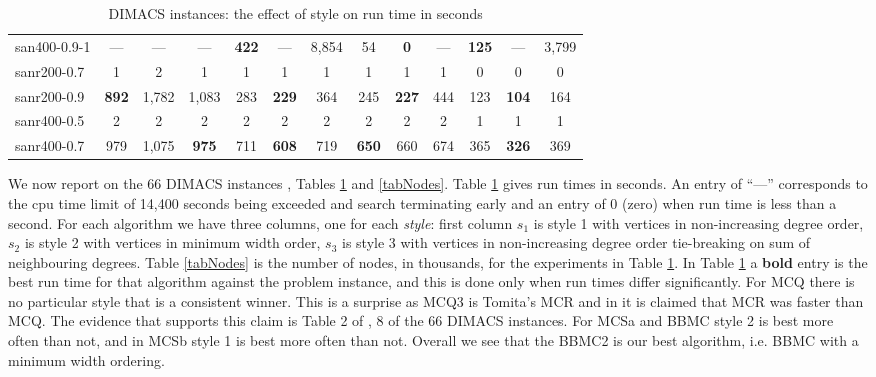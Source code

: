 \documentclass{l4proj}
\begin{document}
\begin{table}
\begin{center}
\begin{tiny}
\begin{tabular}{|l|c c c|c c c|c c c|c c c|}
san400-0.9-1 & --- & --- & --- & \bf{422} & --- & 8,854 & 54 & \bf{0} & --- & \bf{125} & --- & 3,799 \\ 
sanr200-0.7 & 1 & 2 & 1 & 1 & 1 & 1 & 1 & 1 & 1 & 0 & 0 & 0 \\ 
sanr200-0.9 & \bf{892} & 1,782 & 1,083 & 283 & \bf{229} & 364 & 245 & \bf{227} & 444 & 123 & \bf{104} & 164 \\ 
sanr400-0.5 & 2 & 2 & 2 & 2 & 2 & 2 & 2 & 2 & 2 & 1 & 1 & 1 \\ 
sanr400-0.7 & 979 & 1,075 & \bf{975} & 711 & \bf{608} & 719 & \bf{650} & 660 & 674 & 365 & \bf{326} & 369 \\ \hline
\end{tabular}
\end{tiny}
\end{center}
\caption{DIMACS instances: the effect of style on run time in seconds}
\label{tabTime}
\end{table}


We now report on the 66 DIMACS instances \cite{DIMACS}, Tables \ref{tabTime} and \ref{tabNodes}.
Table \ref{tabTime} gives run times in seconds. An entry of ``---'' corresponds to the cpu time limit of 14,400 seconds being exceeded and
search terminating early and an entry of 0 (zero) when run time is less than a second. For each algorithm we have three columns, 
one for each \emph{style}: first column $s_1$ is
style 1 with vertices in non-increasing degree order, $s_2$ is style 2 with vertices in minimum width order, $s_3$ is style 3 with
vertices in non-increasing degree order tie-breaking on sum of neighbouring degrees. Table \ref{tabNodes} is the number of
nodes, in thousands, for the experiments in Table \ref{tabTime}. In Table \ref{tabTime} a {\bf bold} entry is the best 
run time for that algorithm against the problem instance, and this is done only when run times differ significantly.
For MCQ there is no particular style that is a consistent winner. This is a surprise as MCQ3 is Tomita's MCR 
and in \cite{tomita2007} it is claimed that MCR was faster than MCQ. The evidence that supports this claim is
Table 2 of \cite{tomita2007}, 8 of the 66 DIMACS instances. For MCSa and BBMC style 2 is best more often than not, 
and in MCSb style 1 is best more often than not. Overall we see that 
the BBMC2 is our best algorithm, i.e. BBMC with a minimum width ordering. 
\end{document}
